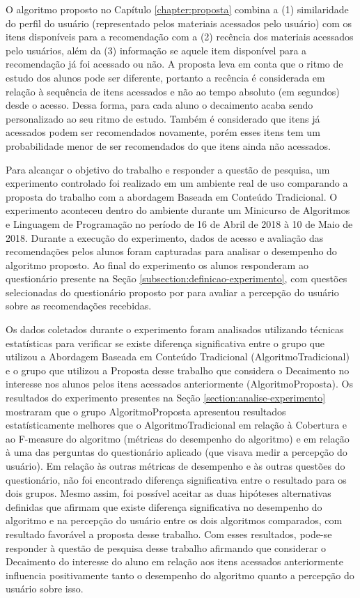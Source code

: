 O algoritmo proposto no Capítulo \ref{chapter:proposta} combina a (1) similaridade do perfil do usuário (representado
pelos materiais acessados pelo usuário) com os itens disponíveis para a recomendação com a (2) recência dos materiais
acessados pelo usuários, além da (3) informação se aquele item disponível para a recomendação já foi acessado ou não. A
proposta leva em conta que o ritmo de estudo dos alunos pode ser diferente, portanto a recência é considerada em relação
à sequência de itens acessados e não ao tempo absoluto (em segundos) desde o acesso. Dessa forma, para cada aluno o
decaimento acaba sendo personalizado ao seu ritmo de estudo. Também é considerado que itens já acessados podem ser
recomendados novamente, porém esses itens tem um probabilidade menor de ser recomendados do que itens ainda não acessados.

Para alcançar o objetivo do trabalho e responder a questão de pesquisa, um experimento controlado foi realizado em um ambiente
real de uso comparando a proposta do trabalho com a abordagem Baseada em Conteúdo Tradicional. O experimento aconteceu
dentro do ambiente \adaptwebspace durante um Minicurso de Algoritmos e Linguagem de Programação no período de 16 de Abril de
2018 à 10 de Maio de 2018. Durante a execução do experimento, dados de acesso e avaliação das recomendações pelos alunos
foram capturadas para analisar o desempenho do algoritmo proposto. Ao final do experimento os alunos responderam ao questionário
presente na Seção \ref{subsection:definicao-experimento}, com questões selecionadas do questionário proposto por  para
avaliar a percepção do usuário sobre as recomendações recebidas.

Os dados coletados durante o experimento foram analisados utilizando técnicas estatísticas para verificar se existe
diferença significativa entre o grupo que utilizou a Abordagem Baseada em Conteúdo Tradicional (AlgoritmoTradicional)
e o grupo que utilizou a Proposta desse trabalho que considera o Decaimento no interesse nos alunos pelos itens acessados
anteriormente (AlgoritmoProposta). Os resultados do experimento presentes na Seção \ref{section:analise-experimento}
mostraram que o grupo AlgoritmoProposta apresentou resultados estatísticamente melhores que o AlgoritmoTradicional em
relação à Cobertura e ao F-measure do algoritmo (métricas do desempenho do algoritmo) e em relação à uma das perguntas
do questionário aplicado (que visava medir a percepção do usuário). Em relação às outras métricas de desempenho e às
outras questões do questionário, não foi encontrado diferença significativa entre o resultado para os dois grupos.
Mesmo assim, foi possível aceitar as duas hipóteses alternativas definidas que afirmam que existe diferença significativa
no desempenho do algoritmo e na percepção do usuário entre os dois algoritmos comparados, com resultado favorável
a proposta desse trabalho. Com esses resultados, pode-se responder à questão de pesquisa desse trabalho afirmando que
considerar o Decaimento do interesse do aluno em relação aos itens acessados anteriormente influencia positivamente
tanto o desempenho do algoritmo quanto a percepção do usuário sobre isso.

